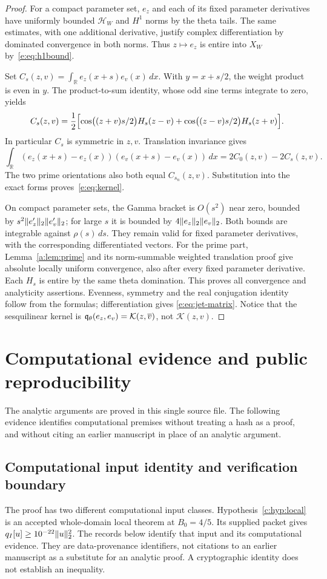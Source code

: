 \documentclass[11pt,a4paper]{article}
\numberwithin{equation}{section}
\theoremstyle{definition}\newtheorem{definition}[theorem]{Definition}
\theoremstyle{remark}\newtheorem{remark}[theorem]{Remark}
\newcommand{\R}{\mathbb R}\newcommand{\C}{\mathbb C}\newcommand{\N}{\mathbb N}
\newcommand{\HH}{\mathcal H_W}\newcommand{\XX}{X_W}\newcommand{\EE}{\mathcal E_{N,\beta}}
\begin{document}
\begin{proof}
For a compact parameter set, $e_z$ and each of its fixed parameter
derivatives have uniformly bounded $\HH$ and $H^1$ norms by the theta
tails. The same estimates, with one additional derivative, justify
complex differentiation by dominated convergence in both norms. Thus
$z\mapsto e_z$ is entire into $\XX$ by~\eqref{e:eq:h1bound}.

Set $C_s(z,v)=\int_\R e_z(x+s)e_v(x)\,dx$. With $y=x+s/2$, the weight
product is even in $y$. The product-to-sum identity, whose odd sine terms
integrate to zero, yields
\begin{equation}\label{e:eq:Cs}
 C_s(z,v)=\frac12\Bigl[
 \cos\bigl((z+v)s/2\bigr)H_s(z-v)
 +\cos\bigl((z-v)s/2\bigr)H_s(z+v)\Bigr].
\end{equation}
In particular $C_s$ is symmetric in $z,v$. Translation invariance gives
\[
 \int_\R(e_z(x+s)-e_z(x))(e_v(x+s)-e_v(x))\,dx
 =2C_0(z,v)-2C_s(z,v).
\]
The two prime orientations also both equal $C_{s_n}(z,v)$.
Substitution into the exact forms proves~\eqref{e:eq:kernel}.

On compact parameter sets, the Gamma bracket is $O(s^2)$ near zero,
bounded by $s^2\lVert e_z'\rVert_2\lVert e_v'\rVert_2$; for large $s$ it is bounded
by $4\lVert e_z\rVert_2\lVert e_v\rVert_2$. Both bounds are integrable against
$\rho(s)\,ds$. They remain valid for fixed parameter derivatives, with
the corresponding differentiated vectors. For the prime part,
Lemma~\ref{a:lem:prime} and its norm-summable weighted translation proof give absolute
locally uniform convergence, also after every fixed parameter derivative.
Each $H_s$ is entire by the same theta domination. This proves all
convergence and analyticity assertions. Evenness, symmetry and the real
conjugation identity follow from the formulas; differentiation gives
\eqref{e:eq:jet-matrix}. Notice that the sesquilinear kernel is
$\mathfrak q_\theta(e_z,e_v)=\mathcal K(z,\overline v)$, not $\mathcal K(z,v)$.
\end{proof}


\section{Computational evidence and public reproducibility}\label{app:provenance-unified}
The analytic arguments are proved in this single source file. The following evidence identifies computational premises without treating a hash as a proof, and without citing an earlier manuscript in place of an analytic argument.


\subsection{Computational input identity and verification boundary}\label{c:app:provenance}
The proof has two different computational input classes.
Hypothesis~\ref{c:hyp:local} is an accepted whole-domain local theorem at ${B_0}=4/5$.
Its supplied packet gives $q_I[u]\ge10^{-22}\lVert u\rVert_2^2$.
The records below identify that input and its computational evidence.
They are data-provenance identifiers, not citations to an earlier manuscript as a substitute for an analytic proof.
A cryptographic identity does not establish an inequality.
\end{document}
